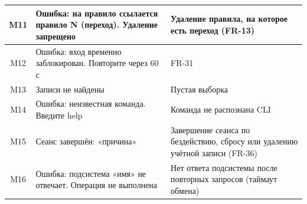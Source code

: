 \documentclass[13pt,a4paper,final]{article}
\begin{document}
\begin{xltabular}{\textwidth}{|c|X|X|}
		\hline
		M11 & Ошибка: на правило {ссылается} правило N (переход). Удаление запрещено & Удаление правила, на которое есть переход {(FR-13)} \\
		\hline
		M12 & Ошибка: вход временно заблокирован. Повторите через 60 с & FR-31 \\
		\hline
		M13 & Записи не найдены & Пустая выборка \\
		\hline
		M14 & Ошибка: неизвестная команда. Введите help & Команда не распознана CLI \\
		\hline
		M15 & Сеанс завершён: «причина» & Завершение сеанса по бездействию, сбросу или удалению учётной записи (FR-36) \\
		\hline
		M16 & Ошибка: подсистема «имя» не отвечает. Операция не выполнена & Нет ответа подсистемы после повторных запросов (таймаут обмена) \\
		\hline
	\end{xltabular}
\end{document}
